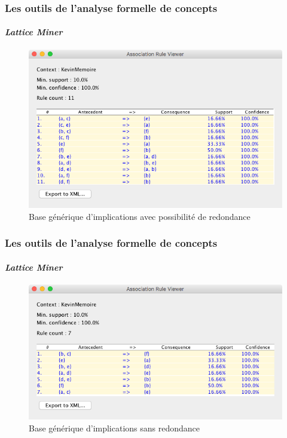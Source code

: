 \documentclass[french]{beamer}
\newcommand{\lm}{\emph{Lattice Miner}\xspace}
\begin{document}
\begin{frame}
\frametitle{Les outils de l'analyse formelle de concepts}
\framesubtitle{\lm}
\begin{figure}[H]
\caption{Base générique d'implications avec possibilité de redondance}
\label{cap:fig:Imp-Red}
\begin{center}\includegraphics[scale=0.45]{figures/ImplRed.png}\end{center}
\end{figure}
\end{frame}
\begin{frame}
\frametitle{Les outils de l'analyse formelle de concepts}
\framesubtitle{\lm}
\begin{figure}[H]
\caption{Base générique d'implications sans redondance}
\label{cap:fig:Imp-NonRed}
\begin{center}\includegraphics[scale=0.45]{figures/ImplNonRed.png}\end{center}
\end{figure}
\end{frame}
\end{document}
